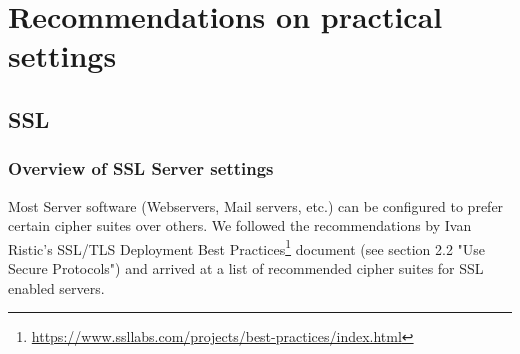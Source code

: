 \section{Recommendations on practical settings}

\subsection{SSL}

%

\subsubsection{Overview of SSL Server settings}

Most Server software (Webservers, Mail servers, etc.) can be configured to prefer certain cipher suites over others. 
We followed the recommendations by Ivan Ristic's SSL/TLS Deployment Best Practices\footnote{\url{https://www.ssllabs.com/projects/best-practices/index.html}} document (see section 2.2 "Use Secure Protocols") and arrived at a list of recommended cipher suites for SSL enabled servers.


